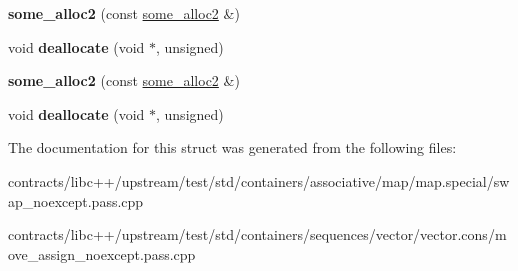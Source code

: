\begin{DoxyCompactItemize}
\item 
\mbox{\label{structsome__alloc2_a23d3a873c40b971fb53239033725bd0f}} 
{\bfseries some\+\_\+alloc2} (const \mbox{\hyperlink{structsome__alloc2}{some\+\_\+alloc2}} \&)
\item 
\mbox{\label{structsome__alloc2_a5e5cb0fbe2fa946cd6af48e1a627ac42}} 
void {\bfseries deallocate} (void $\ast$, unsigned)
\item 
\mbox{\label{structsome__alloc2_a23d3a873c40b971fb53239033725bd0f}} 
{\bfseries some\+\_\+alloc2} (const \mbox{\hyperlink{structsome__alloc2}{some\+\_\+alloc2}} \&)
\item 
\mbox{\label{structsome__alloc2_a5e5cb0fbe2fa946cd6af48e1a627ac42}} 
void {\bfseries deallocate} (void $\ast$, unsigned)
\end{DoxyCompactItemize}


The documentation for this struct was generated from the following files\+:\begin{DoxyCompactItemize}
\item 
contracts/libc++/upstream/test/std/containers/associative/map/map.\+special/swap\+\_\+noexcept.\+pass.\+cpp\item 
contracts/libc++/upstream/test/std/containers/sequences/vector/vector.\+cons/move\+\_\+assign\+\_\+noexcept.\+pass.\+cpp\end{DoxyCompactItemize}
